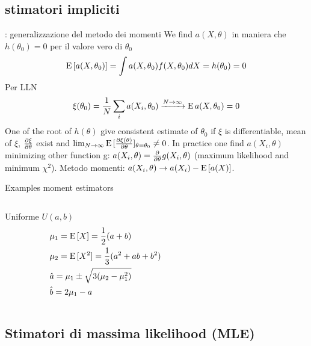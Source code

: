 \documentclass[asd-beamer.tex]{subfiles}
\begin{document}
\subsection{stimatori impliciti}

\begin{frame}{: generalizzazione del metodo dei momenti}
We find $a(X,\theta)$ in maniera che $h(\theta_0)=0$ per il valore vero di $\theta_0$
\[\operatorname{E}{[a(X,\theta_0)]}=\int a(X,\theta_0)f(X,\theta_0)dX=h(\theta_0)=0\]
Per LLN \[\xi(\theta_0)=\frac{1}{N}\sum_ia(X_i,\theta_0)\xrightarrow{N\to\infty}\operatorname{E}{a(X,\theta_0)}=0\]
One of the root of $h(\theta)$ give consistent estimate of $\theta_0$ if $\xi$ is differentiable, mean of $\xi$, $\frac{\partial \xi}{\partial \theta}$ exist and $\lim_{N\to\infty}\operatorname{E}{[\frac{\partial \xi(\theta)}{\partial \theta}]_{\theta=\theta_0}}\neq0$.
In practice one find $a(X_i,\theta)$ minimizing other function g: $a(X_i,\theta)=\frac{\partial}{\partial \theta}g(X_i,\theta)$ (maximum likelihood and minimum $\chi^2$).
Metodo momenti: $a(X_i,\theta)\to a(X_i)-\operatorname{E}{[a(X)]}$.
\end{frame}

\begin{wordonframe}{Examples moment estimators}
\begin{columns}[T]\begin{column}{0.5\textwidth}
\begin{block}{Uniforme $U(a,b)$}
\begin{align*}
&\mu_1=\operatorname{E}{[X]}=\frac{1}{2}(a+b)\\
&\mu_2=\operatorname{E}{[X^2]}=\frac{1}{3}(a^2+ab+b^2)\\
&\hat{a}=\mu_1\pm\sqrt{3(\mu_2-\mu_1^2)}\\
&\hat{b}=2\mu_1-a
\end{align*}
\end{block}
\end{column}\begin{column}{0.5\textwidth}

\end{column}\end{columns}
\end{wordonframe}

\subsection{Stimatori di massima likelihood (MLE)}
\end{document}
